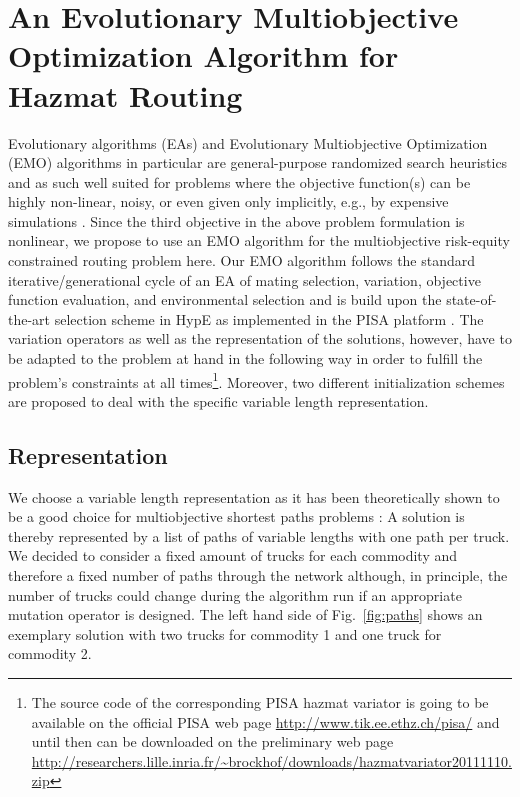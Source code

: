 \documentclass[preprint,12pt]{elsarticle}
\begin{document}
\section{An Evolutionary Multiobjective Optimization Algorithm for Hazmat Routing} \label{S_MEO}
Evolutionary algorithms (EAs) and Evolutionary Multiobjective Optimization (EMO) algorithms in particular are general-purpose randomized search heuristics and as such well suited for problems where the objective function(s) can be highly non-linear, noisy, or even given only implicitly, e.g., by expensive simulations \citep{deb2001a,cvl2007a}. Since the third objective in the above problem formulation is nonlinear, we propose to use an EMO algorithm for the multiobjective risk-equity constrained routing problem here. Our EMO algorithm follows the standard iterative/generational cycle of an EA of mating selection, variation, objective function evaluation, and environmental selection and is build upon the state-of-the-art selection scheme in HypE \citep{bz2011a} as implemented in the PISA platform \citep{bltz2003a}. The variation operators as well as the representation of the solutions, however, have to be adapted to the problem at hand in the following way in order to fulfill the problem's constraints at all times\footnote{The source code of the corresponding PISA hazmat variator is going to be available on the official PISA web page \url{http://www.tik.ee.ethz.ch/pisa/} and until then can be downloaded on the preliminary web page \url{http://researchers.lille.inria.fr/~brockhof/downloads/hazmatvariator20111110.zip}}. Moreover, two different initialization schemes are proposed to deal with the specific variable length representation.

\subsection{Representation}
We choose a variable length representation as it has been theoretically shown to be a good choice for multiobjective shortest paths problems \citep{horo2009a}: A solution is thereby represented by a list of paths of variable lengths with one path per truck. We decided to consider a fixed amount of trucks for each commodity and therefore a fixed number of paths through the network although, in principle, the number of trucks could change during the algorithm run if an appropriate mutation operator is designed. The left hand side of Fig.~\ref{fig:paths} shows an exemplary solution with two trucks for commodity 1 and one truck for commodity 2.
\end{document}
